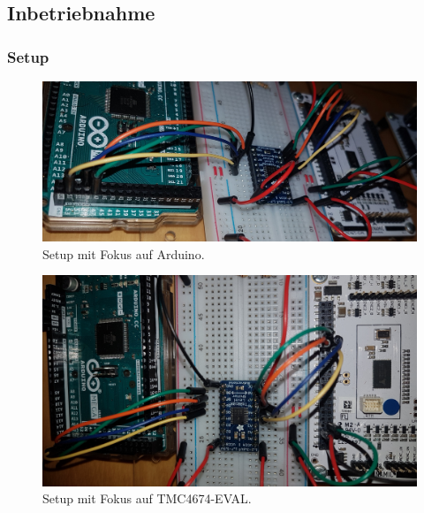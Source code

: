 \subsection{Inbetriebnahme}

\subsubsection{Setup}\label{Appendix:TMC4671_Setup}



\begin{figure}[H]
	\centering
	\includegraphics[width=\textwidth]{graphics/1_Arduino}
	\caption{Setup mit Fokus auf Arduino.}
	\label{fig:1_Arduino}
\end{figure}

\begin{figure}[H]
	\centering
	\includegraphics[angle=180,width=\textwidth]{graphics/1_EVAL}
	\caption{Setup mit Fokus auf TMC4674-EVAL.}
	\label{fig:1_EVAL}
\end{figure}

